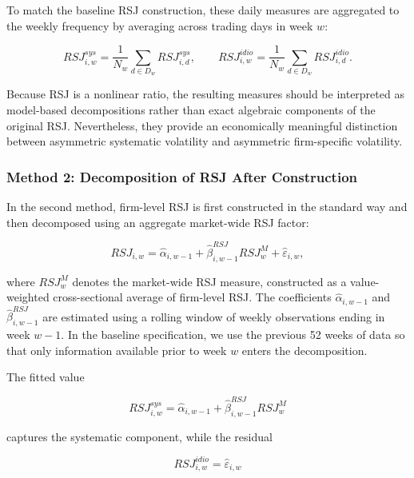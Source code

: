 \documentclass[11pt,a4paper]{article}
\begin{document}
To match the baseline RSJ construction, these daily measures are
aggregated to the weekly frequency by averaging across trading days in
week \(w\):

\begin{equation}
RSJ_{i,w}^{sys}
=
\frac{1}{N_w}\sum_{d \in D_w} RSJ_{i,d}^{sys},
\qquad
RSJ_{i,w}^{idio}
=
\frac{1}{N_w}\sum_{d \in D_w} RSJ_{i,d}^{idio}.
\label{eq:rsj_weekly_m1}
\end{equation}

Because RSJ is a nonlinear ratio, the resulting measures should be
interpreted as model-based decompositions rather than exact algebraic
components of the original RSJ. Nevertheless, they provide an
economically meaningful distinction between asymmetric systematic
volatility and asymmetric firm-specific volatility.

\subsubsection{Method 2: Decomposition of RSJ After Construction}

In the second method, firm-level RSJ is first constructed in the standard
way and then decomposed using an aggregate market-wide RSJ factor:

\begin{equation}
RSJ_{i,w} = \hat{\alpha}_{i,w-1} + \hat{\beta}_{i,w-1}^{RSJ} RSJ^{M}_w + \hat{\varepsilon}_{i,w},
\label{eq:m2_reg}
\end{equation}

where \(RSJ^{M}_w\) denotes the market-wide RSJ measure, constructed as a
value-weighted cross-sectional average of firm-level RSJ. The coefficients
\(\hat{\alpha}_{i,w-1}\) and \(\hat{\beta}_{i,w-1}^{RSJ}\) are estimated
using a rolling window of weekly observations ending in week \(w-1\). In
the baseline specification, we use the previous 52 weeks of data so that
only information available prior to week \(w\) enters the decomposition.

The fitted value

\begin{equation}
RSJ^{sys}_{i,w}
=
\hat{\alpha}_{i,w-1}
+
\hat{\beta}_{i,w-1}^{RSJ} RSJ^{M}_w
\label{eq:rsj_sys_m2}
\end{equation}

captures the systematic component, while the residual

\begin{equation}
RSJ^{idio}_{i,w}
=
\hat{\varepsilon}_{i,w}
\label{eq:rsj_idio_m2}
\end{equation}
\end{document}
